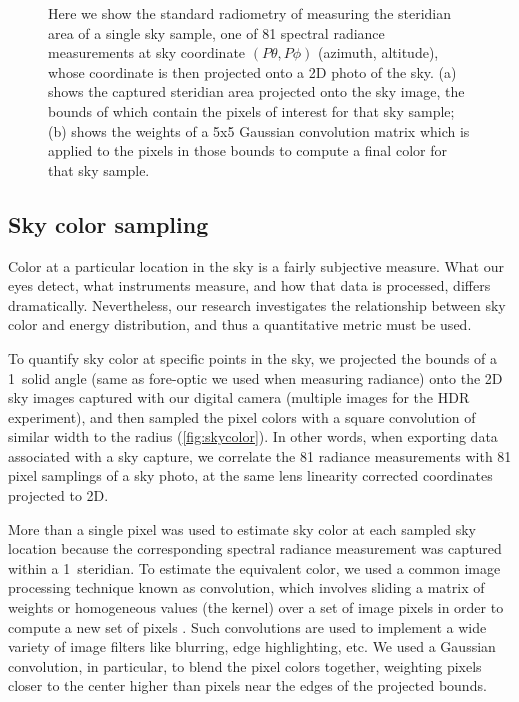 \begin{figure}[pos=tbp]
\begin{center}
\end{center}
\vspace{-2mm}
\caption[skycolor]{Here we show the standard radiometry of measuring the steridian area of a single sky sample, one of 81 spectral radiance measurements at sky coordinate $(P\theta,P\phi)$ (azimuth, altitude), whose coordinate is then projected onto a 2D photo of the sky. (a) shows the captured steridian area projected onto the sky image, the bounds of which contain the pixels of interest for that sky sample; (b) shows the weights of a 5x5 Gaussian convolution matrix which is applied to the pixels in those bounds to compute a final color for that sky sample.}
\label{fig:skycolor}
\end{figure}

\subsection{Sky color sampling}
\label{ssec:skycolor}

Color at a particular location in the sky is a fairly subjective measure. What our eyes detect, what instruments measure, and how that data is processed, differs dramatically. Nevertheless, our research investigates the relationship between sky color and energy distribution, and thus a quantitative metric must be used.

To quantify sky color at specific points in the sky, we projected the bounds of a 1\degree~solid angle (same as fore-optic we used when measuring radiance) onto the 2D sky images captured with our digital camera (multiple images for the HDR experiment), and then sampled the pixel colors with a square convolution of similar width to the radius (\autoref{fig:skycolor}). In other words, when exporting data associated with a sky capture, we correlate the 81 radiance measurements with 81 pixel samplings of a sky photo, at the same lens linearity corrected coordinates projected to 2D.

More than a single pixel was used to estimate sky color at each sampled sky location because the corresponding spectral radiance measurement was captured within a 1\degree~steridian. To estimate the equivalent color, we used a common image processing technique known as convolution, which involves sliding a matrix of weights or homogeneous values (the kernel) over a set of image pixels in order to compute a new set of pixels \citep{parker_imgalgs}. Such convolutions are used to implement a wide variety of image filters like blurring, edge highlighting, etc. We used a Gaussian convolution, in particular, to blend the pixel colors together, weighting pixels closer to the center higher than pixels near the edges of the projected bounds.

